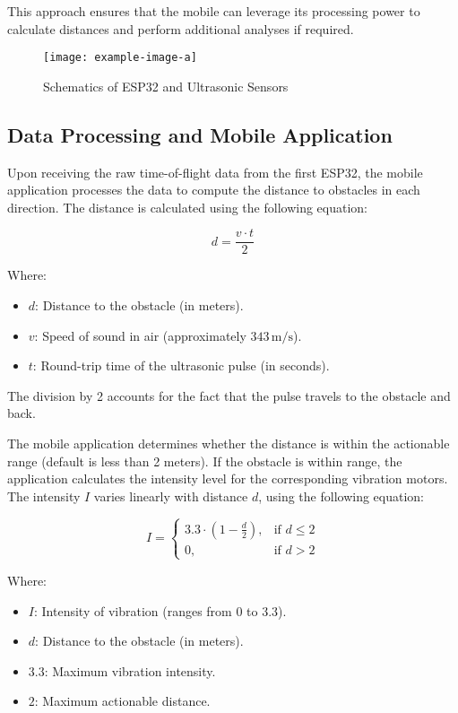 This approach ensures that the mobile can leverage its processing power to calculate distances and perform additional analyses if required.

\begin{figure}[h]
	\centering
	\texttt{[image: example-image-a]}
	\caption{Schematics of ESP32 and Ultrasonic Sensors}
	\label{fig:schematic_esp_ultrasonic}
\end{figure}

\subsection{Data Processing and Mobile Application}

Upon receiving the raw time-of-flight data from the first ESP32, the mobile application processes the data to compute the distance to obstacles in each direction. The distance is calculated using the following equation:

\[
d = \frac{v \cdot t}{2}
\]

Where:
\begin{itemize}
	\item \(d\): Distance to the obstacle (in meters).
	\item \(v\): Speed of sound in air (approximately \(343 \, \text{m/s}\)).
	\item \(t\): Round-trip time of the ultrasonic pulse (in seconds).
\end{itemize}

The division by 2 accounts for the fact that the pulse travels to the obstacle and back.

The mobile application determines whether the distance is within the actionable range (default is less than 2 meters). If the obstacle is within range, the application calculates the intensity level for the corresponding vibration motors. The intensity \(I\) varies linearly with distance \(d\), using the following equation:

\[
I = 
\begin{cases} 
	3.3 \cdot \left(1 - \frac{d}{2}\right), & \text{if } d \leq 2 \\ 
	0, & \text{if } d > 2
\end{cases}
\]

Where:
\begin{itemize}
	\item \(I\): Intensity of vibration (ranges from 0 to 3.3).
	\item \(d\): Distance to the obstacle (in meters).
	\item \(3.3\): Maximum vibration intensity.
	\item \(2\): Maximum actionable distance.
\end{itemize}

